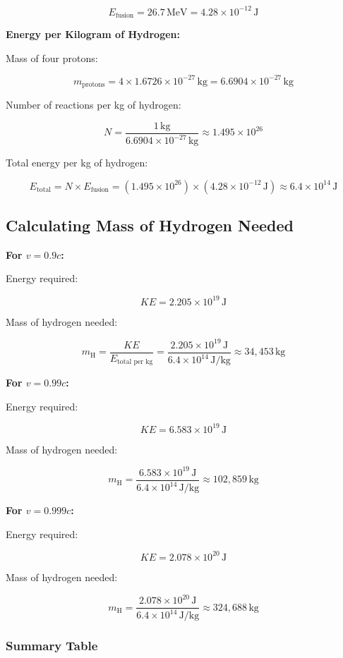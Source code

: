 \documentclass{article}
\begin{document}
\begin{multicols}{2}
\[
E_{\text{fusion}} = 26.7\, \text{MeV} = 4.28 \times 10^{-12}\, \text{J}
\]

\textbf{Energy per Kilogram of Hydrogen:}

Mass of four protons:

\[
m_{\text{protons}} = 4 \times 1.6726 \times 10^{-27}\, \text{kg} = 6.6904 \times 10^{-27}\, \text{kg}
\]

Number of reactions per kg of hydrogen:

\[
N = \frac{1\, \text{kg}}{6.6904 \times 10^{-27}\, \text{kg}} \approx 1.495 \times 10^{26}
\]

Total energy per kg of hydrogen:

\[
E_{\text{total}} = N \times E_{\text{fusion}} = (1.495 \times 10^{26}) \times (4.28 \times 10^{-12}\, \text{J}) \approx 6.4 \times 10^{14}\, \text{J}
\]

\subsection*{Calculating Mass of Hydrogen Needed}

\textbf{For \( v = 0.9c \):}

Energy required:

\[
KE = 2.205 \times 10^{19}\, \text{J}
\]

Mass of hydrogen needed:

\[
m_{\text{H}} = \frac{KE}{E_{\text{total per kg}}} = \frac{2.205 \times 10^{19}\, \text{J}}{6.4 \times 10^{14}\, \text{J/kg}} \approx 34,453\, \text{kg}
\]

\textbf{For \( v = 0.99c \):}

Energy required:

\[
KE = 6.583 \times 10^{19}\, \text{J}
\]

Mass of hydrogen needed:

\[
m_{\text{H}} = \frac{6.583 \times 10^{19}\, \text{J}}{6.4 \times 10^{14}\, \text{J/kg}} \approx 102,859\, \text{kg}
\]

\textbf{For \( v = 0.999c \):}

Energy required:

\[
KE = 2.078 \times 10^{20}\, \text{J}
\]

Mass of hydrogen needed:

\[
m_{\text{H}} = \frac{2.078 \times 10^{20}\, \text{J}}{6.4 \times 10^{14}\, \text{J/kg}} \approx 324,688\, \text{kg}
\]

\subsubsection*{Summary Table}


\end{multicols}
\end{document}
